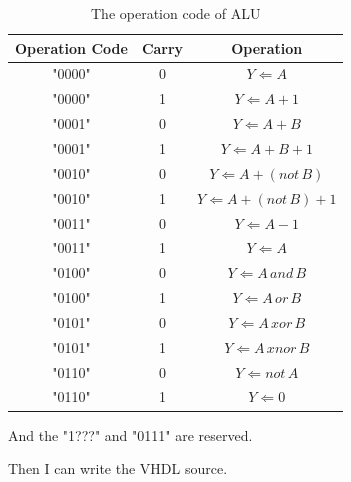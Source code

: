 \documentclass{article}
\begin{document}
    \begin{table}
        \centering
        \begin{tabular}{|c|c|c|}
            \hline Operation Code & Carry & Operation \\ 
            \hline "0000" & 0 & $ Y \Leftarrow A$ \\ 
            \hline "0000" & 1 & $ Y \Leftarrow A + 1$ \\ 
            \hline "0001" & 0 & $ Y \Leftarrow A + B $ \\ 
            \hline "0001" & 1 & $ Y \Leftarrow A + B + 1 $ \\ 
            \hline "0010" & 0 & $ Y \Leftarrow A + (not\,B)$ \\ 
            \hline "0010" & 1 & $ Y \Leftarrow A +(not\,B) + 1$ \\
            \hline "0011" & 0 & $ Y \Leftarrow A - 1$ \\
            \hline "0011" & 1 & $ Y \Leftarrow A$ \\ 
            \hline "0100" & 0 & $ Y \Leftarrow A\,and\,B $ \\
            \hline "0100" & 1 & $ Y \Leftarrow A\,or\,B $ \\
            \hline "0101" & 0 & $ Y \Leftarrow A\,xor\,B $ \\
            \hline "0101" & 1 & $ Y \Leftarrow A\,xnor\,B$ \\
            \hline "0110" & 0 & $ Y \Leftarrow not\,A$ \\
            \hline "0110" & 1 & $ Y \Leftarrow 0 $\\
            \hline
        \end{tabular}
        \caption{The operation code of ALU}
        \label{tab:alu:code}
    \end{table} 
    
    And the "1???" and "0111" are reserved.
    
    
    Then I can write the VHDL source.
\end{document}
